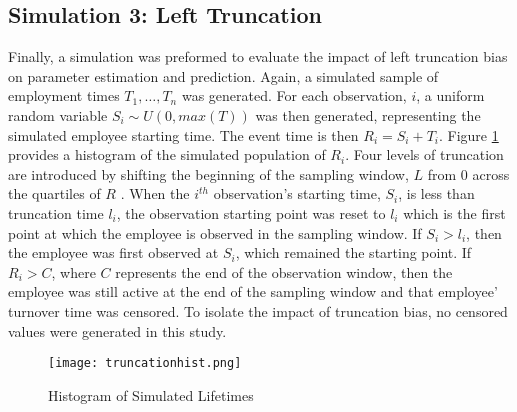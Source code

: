 \subsection{Simulation 3: Left Truncation}
Finally, a simulation was preformed to evaluate the impact of left truncation bias on parameter estimation and prediction. Again, a simulated sample of employment times $T_1, \ldots, T_n$ was generated. For each observation, $i$, a uniform random variable $S_i \sim U(0,max(T))$ was then generated, representing the simulated employee starting time. The event time is then $R_i = S_i+T_i$. Figure \ref{fig:trunchist} provides a histogram of the simulated population of $R_i$. Four levels of truncation are introduced by shifting the beginning of the sampling window, $L$ from 0 across the quartiles of $R$ . When the $i^{th}$ observation's starting time, $S_i$, is less than truncation time $l_i$, the observation starting point was reset to $l_i$ which is the first point at which the employee is observed in the sampling window. If $S_i> l_i$, then the employee was first observed at $S_i$, which remained the starting point.  If $R_i>C$, where $C$ represents the end of the observation window, then the employee was still active at the end of the sampling window and that employee' turnover time was censored. To isolate the impact of truncation bias, no censored values were generated in this study.

\begin{figure}[h!]
	\centering
    \texttt{[image: truncationhist.png]}
	\caption{Histogram of Simulated Lifetimes}
 	\label{fig:trunchist}
 \end{figure}

